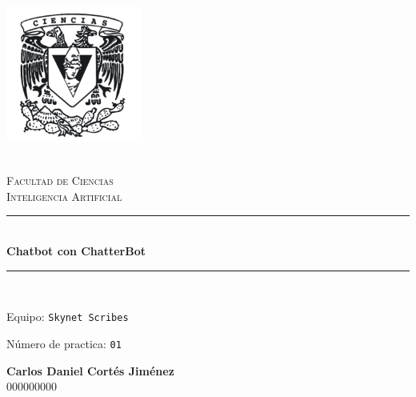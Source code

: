 \begin{titlepage}
\center 
\newcommand{\HRule}{\rule{\linewidth}{0.5mm}} 

\includegraphics[width=4.5cm]{IMA/cienciasWhite.png}

\quad \\[0.2cm]
\textsc{\huge Facultad de Ciencias}\\[.6cm] 
\textsc{\huge Inteligencia Artificial}\\[0.5cm]

\makeatletter
    \HRule \\ [0.4cm]
        { \huge \bfseries Chatbot con ChatterBot}\\
    \HRule \\ [0.4cm]
    
\vspace{2mm}

\begin{flushleft}
    \Large{Equipo:} \texttt{\Large Skynet Scribes}
\end{flushleft}
\begin{flushleft}
    \Large{Número de practica:} \texttt{\Large 01}\\[0.8cm]
\end{flushleft}


\begin{minipage}{0.8\textwidth}
    \begin{flushright}
        \textbf{\large{Carlos Daniel Cortés Jiménez}}\\    
        000000000        
    \end{flushright}
\end{minipage}

\vspace{5mm}


\end{titlepage}
